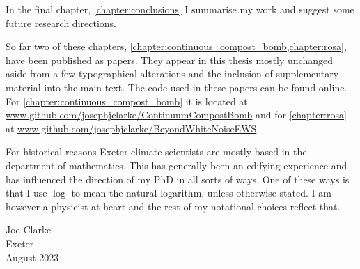 In the final chapter, \cref{chapter:conclusions} I summarise my work and suggest some future research directions.

So far two of these chapters, \cref{chapter:continuous_compost_bomb,chapter:rosa}, have been published as papers. They appear in this thesis mostly unchanged
aside from a few typographical alterations and the inclusion of supplementary material into the main text. The code used in these papers can be found online. 
For \cref{chapter:continuous_compost_bomb} it is located at \url{www.github.com/josephjclarke/ContinuumCompostBomb} and for
\cref{chapter:rosa} at \url{www.github.com/josephjclarke/BeyondWhiteNoiseEWS}.

For historical reasons Exeter climate scientists are mostly based in the department of mathematics. This has generally been an edifying experience and has influenced the
direction of my PhD in all sorts of ways. One of these ways is that I use $\log$ to mean the natural logarithm, unless otherwise stated. I am however a physicist
at heart and the rest of my notational choices reflect that.

\begin{flushright}
  Joe Clarke\\
  Exeter\\
  August 2023
\end{flushright}